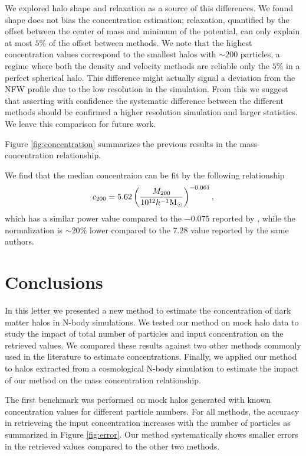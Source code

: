 \documentclass[a4,useAMS,usenatbib,usegraphicx]{mn2e}
\newcommand{\hMsun}{{\ifmmode{h^{-1}{\rm {M_{\odot}}}}\else{$h^{-1}{\rm{M_{\odot}}}$}\fi}}
\begin{document}
We explored halo shape and relaxation as a source of this
differences. We found shape does not bias the concentration
estimation; relaxation, quantified by the
offset between the center of mass and minimum of the potential, can
only explain at most $5\%$ of the offset between methods.  We note
that the highest concentration values correspond to the smallest halos
with $\sim 200$ particles, a regime where both the density and
velocity methods are reliable only the $5\%$ in a perfect spherical
halo.  
This difference might actually signal a deviation from the NFW profile
due to the low resolution in the simulation. From this we suggest that
asserting with confidence the systematic difference between the
different methods should be confirmed  a higher resolution simulation
and larger statistics. We leave this comparison for future work. 
  

Figure \ref{fig:concentration} summarizes the previous results in the
mass-concentration relationship.

We find that the median concentraion can be fit by the following
relationship
\begin{equation}
c_{200} = 5.62 \left(\frac{M_{200}}{10^{12}\hMsun}\right)^{-0.061}, 
\end{equation}
%
which has a similar power value compared to the $-0.075$ reported by
\citep{Prada2012}, while the normalization is $\sim 20\%$ lower
compared to the $7.28$ value reported by the same authors. 


\section{Conclusions}
\label{sec:conclusions}

In this letter we presented a new method to estimate the concentration
of dark matter halos in N-body simulations.  
We tested our method on mock halo data to study the impact of total
number of particles and input concentration on the retrieved values.  
We compared these results against two other methods commonly used in
the literature to estimate concentrations.  Finally, we applied our
method to halos extracted from a cosmological N-body simulation to
estimate the impact of our method on the mass concentration relationship.


The first benchmark was performed on mock halos generated with known
concentration values for different particle numbers.  For all methods,
the accuracy in retrieveing the input concentration increases with the
number of particles as summarized in Figure \ref{fig:error}.  Our
method systematically shows smaller errors in the retrieved values
compared to the other two methods.
\end{document}
